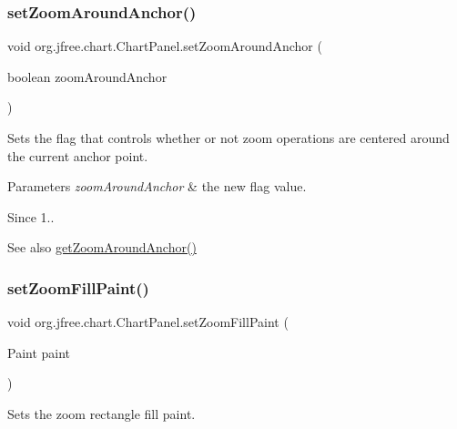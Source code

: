 \subsubsection{\texorpdfstring{set\+Zoom\+Around\+Anchor()}{setZoomAroundAnchor()}}
{\footnotesize\ttfamily void org.\+jfree.\+chart.\+Chart\+Panel.\+set\+Zoom\+Around\+Anchor (\begin{DoxyParamCaption}\item[{boolean}]{zoom\+Around\+Anchor }\end{DoxyParamCaption})}

Sets the flag that controls whether or not zoom operations are centered around the current anchor point.


\begin{DoxyParams}{Parameters}
{\em zoom\+Around\+Anchor} & the new flag value.\\
\hline
\end{DoxyParams}
\begin{DoxySince}{Since}
1..
\end{DoxySince}
\begin{DoxySeeAlso}{See also}
\mbox{\hyperlink{classorg_1_1jfree_1_1chart_1_1_chart_panel_a6065bf6f61e0af4aafccc420853332a6}{get\+Zoom\+Around\+Anchor()}} 
\end{DoxySeeAlso}
\mbox{\label{classorg_1_1jfree_1_1chart_1_1_chart_panel_aacca6fbee6fa44be58e9b580b11c65f7}} 
\subsubsection{\texorpdfstring{set\+Zoom\+Fill\+Paint()}{setZoomFillPaint()}}
{\footnotesize\ttfamily void org.\+jfree.\+chart.\+Chart\+Panel.\+set\+Zoom\+Fill\+Paint (\begin{DoxyParamCaption}\item[{Paint}]{paint }\end{DoxyParamCaption})}

Sets the zoom rectangle fill paint.


